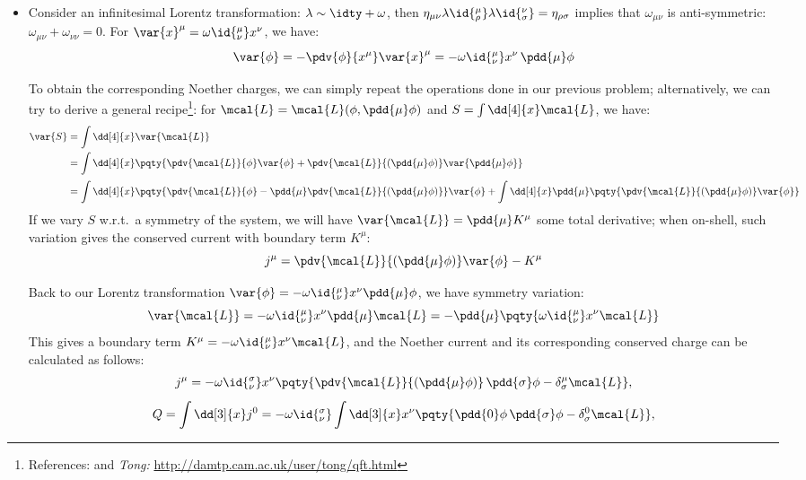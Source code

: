 \documentclass[a4paper,10pt]{article}
\begin{document}
\begin{itemize}
	\item Consider an infinitesimal Lorentz transformation: $\lambda \sim \idty + \omega$, then $
		\eta_{\mu\nu}
			\lambda\id{^\mu_\rho}
			\lambda\id{^\nu_\sigma}
		= \eta_{\rho\sigma}
	$ implies that $\omega_{\mu\nu}$ is anti-symmetric: $
		\omega_{\mu\nu} + \omega_{\nu\nu} = 0
	$. For $
		\var{x}^\mu
		= \omega\id{^\mu_\nu} x^\nu
	$, we have:
	\begin{equation}
		\var{\phi} = - \pdv{\phi}{x^\mu}
			\var{x}^\mu
		= - \omega\id{^\mu_\nu} x^\nu\,
			\pdd{\mu}\phi
	\end{equation}
	
	To obtain the corresponding Noether charges, we can simply repeat the operations done in our previous problem; alternatively, we can try to derive a general recipe\footnote{
		References:  and \textit{Tong:} \url{http://damtp.cam.ac.uk/user/tong/qft.html}
	}: for $
		\mcal{L} = \mcal{L}(\phi,\pdd{\mu}\phi)
	$ and $
		S = \int \dd[4]{x} \mcal{L}
	$, we have:
	\begin{equation}
	\begin{aligned}
		\var{S}
		&= \int\dd[4]{x} \var{\mcal{L}} \\
		&= \int\dd[4]{x} \pqty{
			\pdv{\mcal{L}}{\phi} \var{\phi}
			+ \pdv{\mcal{L}}{(\pdd{\mu}\phi)}
				\var{\pdd{\mu}\phi}
		} \\[.5ex]
		&= \int\dd[4]{x} \pqty{
				\pdv{\mcal{L}}{\phi}
				- \pdd{\mu}
				\pdv{\mcal{L}}{(\pdd{\mu}\phi)}
			} \var{\phi}
		+ \int\dd[4]{x}
			\pdd{\mu} \pqty{
				\pdv{\mcal{L}}{(\pdd{\mu}\phi)}
				\var{\phi}
			}
	\end{aligned}
	\end{equation}
	If we vary $S$ w.r.t.\ a symmetry of the system, we will have $\var{\mcal{L}} = \pdd{\mu} K^\mu$ some total derivative; when on-shell, such variation gives the conserved current with boundary term $K^\mu$:
	\begin{equation}
		j^\mu
		= \pdv{\mcal{L}}{(\pdd{\mu}\phi)}
			\var{\phi} - K^\mu
	\end{equation}
	
	Back to our Lorentz transformation $
		\var{\phi}
		= -\omega\id{^\mu_\nu} x^\nu\pdd{\mu}\phi
	$, we have symmetry variation:
	\begin{equation}
		\var{\mcal{L}}
		= - \omega\id{^\mu_\nu} x^\nu
			\pdd{\mu} \mcal{L}
		= - \pdd{\mu} \pqty{
			\omega\id{^\mu_\nu} x^\nu
			\mcal{L}
		}
	\end{equation}
	This gives a boundary term $
		K^\mu = -\omega\id{^\mu_\nu} x^\nu \mcal{L}
	$, and the Noether current and its corresponding conserved charge can be calculated as follows:
	\begin{gather}
		j^\mu = -\omega\id{^\sigma_\nu} x^\nu
		\pqty{
			\pdv{\mcal{L}}{(\pdd{\mu}\phi)}
				\,\pdd{\sigma} \phi
			- \delta^\mu_\sigma \mcal{L}
		},\\[1ex]
		Q = \int \dd[3]{x} j^0
		= - \omega\id{^\sigma_\nu} \int \dd[3]{x}
		x^\nu \pqty{
			\pdd{0}\phi\,\pdd{\sigma}\phi
			- \delta^0_\sigma \mcal{L}
		},
	\end{gather}
	

\end{itemize}
\end{document}
